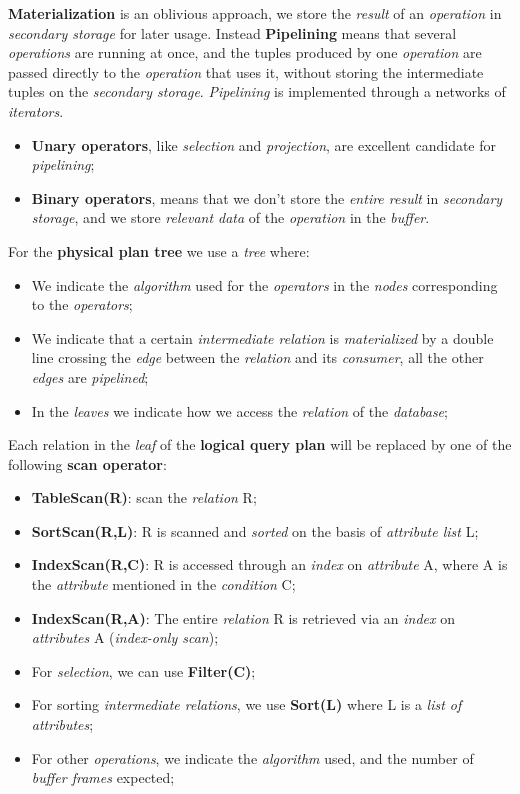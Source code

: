 \documentclass{article}
\begin{document}
\textbf{Materialization} is an oblivious approach, we store the \emph{result} of an \emph{operation} in \emph{secondary storage} for later usage. Instead \textbf{Pipelining} means that several \emph{operations} are running at once, and the tuples produced by one \emph{operation} are passed directly to the \emph{operation} that uses it, without storing the intermediate tuples on the \emph{secondary storage}. \emph{Pipelining} is implemented through a networks of \emph{iterators}. 
\begin{itemize}
\item \textbf{Unary operators}, like \emph{selection} and \emph{projection}, are excellent candidate for \emph{pipelining};
\item \textbf{Binary operators}, means that we don't store the \emph{entire result} in \emph{secondary storage}, and we store \emph{relevant data} of the \emph{operation} in the \emph{buffer}. 
\end{itemize}
For the \textbf{physical plan tree} we use a \emph{tree} where:
\begin{itemize}
\item We indicate the \emph{algorithm} used for the \emph{operators} in the \emph{nodes} corresponding to the \emph{operators};
\item We indicate that a certain \emph{intermediate relation} is \emph{materialized} by a double line crossing the \emph{edge} between the \emph{relation} and its \emph{consumer}, all the other \emph{edges} are \emph{pipelined};
\item In the \emph{leaves} we indicate how we access the \emph{relation} of the \emph{database};
\end{itemize}
Each relation in the \emph{leaf} of the \textbf{logical query plan} will be replaced by one of the following \textbf{scan operator}:
\begin{itemize}
\item \textbf{TableScan(R)}: scan the \emph{relation} R;
\item \textbf{SortScan(R,L)}: R is scanned and \emph{sorted} on the basis of \emph{attribute list} L;
\item \textbf{IndexScan(R,C)}: R is accessed through an \emph{index} on \emph{attribute} A, where A is the \emph{attribute} mentioned in the \emph{condition} C;
\item \textbf{IndexScan(R,A)}: The entire \emph{relation} R is retrieved via an \emph{index} on \emph{attributes} A (\emph{index-only scan});
\item For \emph{selection}, we can use \textbf{Filter(C)};
\item For sorting \emph{intermediate relations}, we use \textbf{Sort(L)} where L is a \emph{list of attributes};
\item For other \emph{operations}, we indicate the \emph{algorithm} used, and the number of \emph{buffer frames} expected;
\end{itemize}
\end{document}

